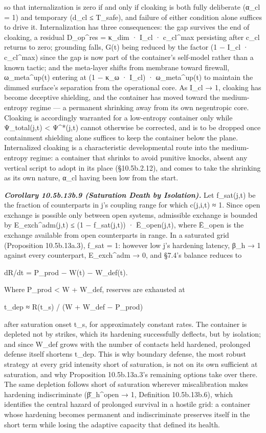 \documentclass[
]{article}
\begin{document}
so that internalization is zero if and only if cloaking is both fully
deliberate (α\_cl = 1) and temporary (d\_cl ≤ T\_safe), and failure of
either condition alone suffices to drive it. Internalization has three
consequences: the gap survives the end of cloaking, a residual
D\_op\^{}res = κ\_dim · I\_cl · c\_cl\^{}max persisting after c\_cl
returns to zero; grounding falls, G(t) being reduced by the factor (1 −
I\_cl · c\_cl\^{}max) since the gap is now part of the container's
self-model rather than a known tactic; and the meta-layer shifts from
membrane toward firewall, ω\_meta\^{}up(t) entering at (1 − κ\_ω ·
I\_cl) · ω\_meta\^{}up(t) to maintain the dimmed surface's separation
from the operational core. As I\_cl → 1, cloaking has become deceptive
shielding, and the container has moved toward the medium-entropy regime
--- a permanent shrinking away from its own negentropic core. Cloaking is
accordingly warranted for a low-entropy container only while
Ψ\_total(j,t) \textless{} Ψ\^{}*(j,t) cannot otherwise be corrected,
and is to be dropped once containment shielding alone suffices to keep
the container below the plane. Internalized cloaking is a characteristic
developmental route into the medium-entropy regime: a container that
shrinks to avoid punitive knocks, absent any vertical script to adopt in
its place (§10.5b.2.12), and comes to take the shrinking as its own
nature, α\_cl having been low from the start.

\emph{\textbf{Corollary 10.5b.13b.9 (Saturation Death by Isolation).}}
Let f\_sat(j,t) be the fraction of counterparts in j's coupling range
for which c(j,i,t) ≈ 1. Since open exchange is possible only between
open systems, admissible exchange is bounded by E\_exch\^{}adm(j,t) ≤
(1 − f\_sat(j,t)) · Ē\_open(j,t), where Ē\_open is the exchange
available from open counterparts in range. In a saturated grid
(Proposition 10.5b.13a.3), f\_sat = 1: however low j's hardening latency,
β\_h → 1 against every counterpart, E\_exch\^{}adm → 0, and §7.4's balance
reduces to

dR/dt = P\_prod − W(t) − W\_def(t).

Where P\_prod \textless{} W + W\_def, reserves are exhausted at

t\_dep ≈ R(t\_s) / (W + W\_def − P\_prod)

after saturation onset t\_s, for approximately constant rates. The
container is depleted not by strikes, which its hardening successfully
deflects, but by isolation; and since W\_def grows with the number of
contacts held hardened, prolonged defense itself shortens t\_dep. This is
why boundary defense, the most robust strategy at every grid intensity
short of saturation, is not on its own sufficient at saturation, and why
Proposition 10.5b.13a.3's remaining options take over there. The same
depletion follows short of saturation wherever miscalibration makes
hardening indiscriminate (β̄\_h\^{}open → 1, Definition 10.5b.13b.6),
which identifies the central hazard of prolonged survival in a hostile
grid: a container whose hardening becomes permanent and indiscriminate
preserves itself in the short term while losing the adaptive capacity
that defined its health.
\end{document}

